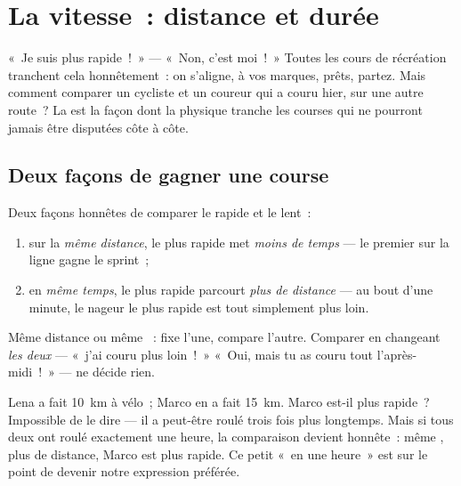 \chapter{La vitesse~: distance et durée}\label{ch:g5:speed-distance-time}

«~Je suis plus rapide~!~» --- «~Non, c'est moi~!~» Toutes les cours
de récréation tranchent cela honnêtement~: on s'aligne, à vos
marques, prêts, partez. Mais comment comparer un cycliste et un
coureur qui a couru hier, sur une autre route~? La  est la
façon dont la physique tranche les courses qui ne pourront jamais
être disputées côte à côte.

\section{Deux façons de gagner une course}

\begin{proposition}\label{prop:g5:speed-distance-time:rules}
Deux façons honnêtes de comparer le rapide et le lent~:
\begin{enumerate}
  \item sur la \emph{même distance}, le plus rapide met \emph{moins
        de temps} --- le premier sur la ligne gagne le sprint~;
  \item en \emph{même temps}, le plus rapide parcourt \emph{plus de
        distance} --- au bout d'une minute, le nageur le plus rapide
        est tout simplement plus loin.
\end{enumerate}
Même distance ou même ~: fixe l'une, compare l'autre. Comparer
en changeant \emph{les deux} --- «~j'ai couru plus loin~!~» «~Oui,
mais tu as couru tout l'après-midi~!~» --- ne décide rien.
\end{proposition}

\begin{example}\label{ex:g5:speed-distance-time:fair}
Lena a fait \qty{10}{km} à vélo~; Marco en a fait \qty{15}{km}. Marco
est-il plus rapide~? Impossible de le dire --- il a peut-être roulé
trois fois plus longtemps. Mais si tous deux ont roulé exactement une
heure, la comparaison devient honnête~: même , plus de distance,
Marco est plus rapide. Ce petit «~en une heure~» est sur le point de
devenir notre expression préférée.
\end{example}


